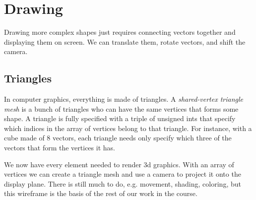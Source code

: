 \section{Drawing}

Drawing more complex shapes just requires connecting
vectors together and displaying them on screen. We can
translate them, rotate vectors, and shift the camera.

\subsection{Triangles}

In computer graphics, everything is made of triangles.
A \emph{shared-vertex triangle mesh} is a bunch of triangles
who can have the same vertices that forms some shape. A
triangle is fully specified with a triple of unsigned ints
that specify which indices in the array of vertices belong
to that triangle. For instance, with a cube made of 8 vectors,
each triangle needs only specify which three of the vectors
that form the vertices it has.

We now have every element needed to render 3d graphics.
With an array of vertices we can create a triangle mesh
and use a camera to project it onto the display plane.
There is still much to do, e.g. movement, shading, coloring,
but this wireframe is the basis of the rest of our work in
the course.